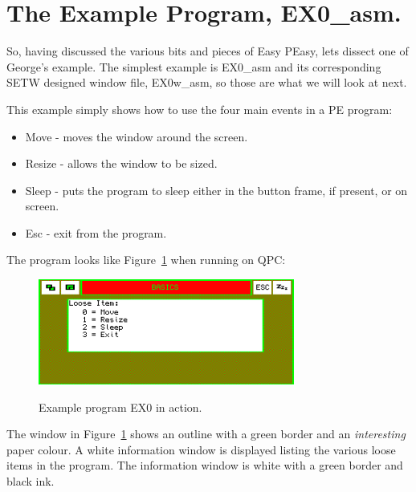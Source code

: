 \section{The Example Program, EX0\_asm.}
\label{ch26-ex0}%

So, having discussed the various bits and pieces of Easy PEasy, lets dissect
        one of George's example. The simplest example is EX0\_asm and
        its corresponding SETW designed window file,
 EX0w\_asm, so those are what we will look at next.

This example simply shows how to use the four main events in a PE
        program:
\begin{itemize}[itemsep=0pt]

\item{}Move -{} moves the window around the screen.


\item{}Resize -{} allows the window to be sized.


\item{}Sleep -{} puts the program to sleep either in the button frame, if
                present, or on screen.


\item{}Esc -{} exit from the program.

\end{itemize}

The program looks like Figure~\ref{fig:ExampleProgramEX0InAction} when running on QPC:

\begin{figure}[h]
\center
\includegraphics[width=0.75\textwidth,keepaspectratio=true]{Content/images/peas_ex0.png}
\label{fig:ExampleProgramEX0InAction}
\caption{Example program EX0 in action.}
\end{figure}


The window in Figure~\ref{fig:ExampleProgramEX0InAction} shows an outline with a green border and an
 \emph{interesting} paper colour. A white information window is
        displayed listing the various loose items in the program. The information window
        is white with a green border and black ink.

